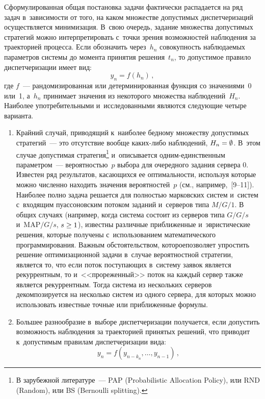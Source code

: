 \begin{multicols}{2}
    Сформулированная общая постановка задачи фактически распадается на ряд задач 
в~зависимости от того, на каком множестве допустимых диспетчеризаций осуществляется 
минимизация. В~свою очередь, задание множества допустимых стратегий можно 
интерпретировать с~точки зрения возможностей наблюдения за траекторией процесса. 
Если обозначить через~$h_n$ совокупность наблюдаемых параметров системы до 
момента принятия решения~$t_n$, то допустимое правило диспетчеризации имеет вид:
    $$
    y_n=f\left(h_n\right)\,,
    $$
где $f$~--- рандомизированная или детерми\-ни\-ро\-ванная функция со значениями~0 или~1, 
а~$h_n$ при\-нимает значения из некоторого множества наблюдений~$H_n$. Наиболее 
употребительными и~исследован\-ными являются следующие четыре варианта.
\begin{enumerate}[1.]
    \item  Крайний случай, приводящий к~наиболее бедному множеству допустимых 
стратегий~--- это отсутствие вообще каких-либо наблюдений, $H_n\hm= \emptyset$. 
В~этом случае допустимая стратегия\footnote{В зарубежной литературе~--- PAP (Probabilistic 
Allocation Policy), или RND (Random), или BS (Bernoulli splitting).} и~описывается 
одним-единственным па\-ра\-мет\-ром~--- вероятностью~$p$ выбора для очередного задания сервера 0. 
Известен ряд результатов, касающихся ее оптимальности, используя которые можно 
численно находить значения вероятностей~$p$ (см.,  
например,~[9--11]). Наиболее полно задача решается для пол\-ностью 
марковских систем и~систем с~входящим пуассоновским потоком заданий и~серверов типа 
$M/G/1$. В общих случаях (например, когда система состоит из серверов типа $G/G/s$ 
и~MAP$/G/s$, $s\hm\geq 1$), известны различные приближенные и~эвристические решения, 
которые получены с~использованием математического программирования. Важным 
обстоятельством, которое\linebreak позволяет упростить решение оптимизационной задачи в~случае 
вероятностной стратегии, является то, что если поток по\-сту\-па\-ющих в~сис\-те\-му заявок 
является рекуррентным, то и~<<прореженный>> поток на каж\-дый сервер так\-же является 
рекуррентным. Тогда система из нескольких серверов декомпозируется на несколько сис\-тем из 
  одного сервера, для которых можно использовать известные 
точные или приближенные формулы.
    \item Большее разнообразие в~выборе диспетчеризации получается, если допустить 
возможность наблюдения за траекторией принятых решений, что приводит к~допустимым 
правилам диспетчеризации вида:
    $$
    y_n=f\left( y_{n-k_n},\ldots, y_{n-1}\right)\,,
$$
\end{enumerate}
\end{multicols}
